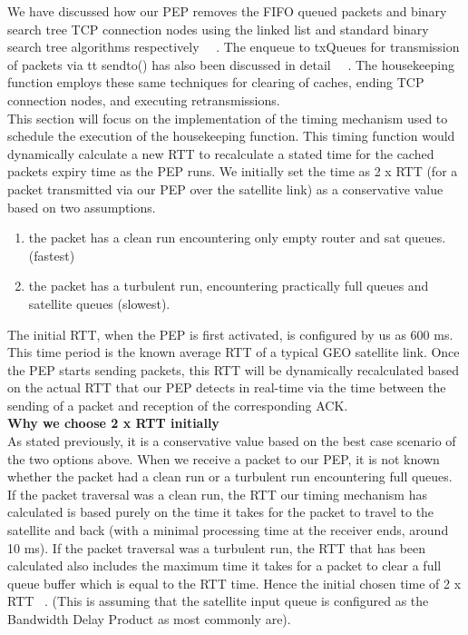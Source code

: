 We have discussed how our PEP removes the FIFO queued packets and binary search tree TCP connection nodes using the linked list and standard binary search tree algorithms respectively ~\cite{42}~\cite{43}. The enqueue to txQueues for transmission of packets via {tt sendto()} has also been discussed in detail ~\cite{35}~\cite{38}. The housekeeping function employs these same techniques for clearing of caches, ending TCP connection nodes, and executing retransmissions. \\

This section will focus on the implementation of the timing mechanism used to schedule the execution of the housekeeping function. This timing function would dynamically calculate a new RTT to recalculate a stated time for the cached packets expiry time as the PEP runs. We initially set the time as 2 x RTT (for a packet transmitted via our PEP over the satellite link) as a conservative value based on two assumptions. \\

\begin{enumerate}
\item the packet has a clean run encountering only empty router and sat queues. (fastest)
\item the packet has a turbulent run, encountering practically full queues and satellite queues (slowest). \\
\end{enumerate}

The initial RTT, when the PEP is first activated, is configured by us as 600 ms. This time period is the known average RTT of a typical GEO satellite link. Once the PEP starts sending packets, this RTT will be dynamically recalculated based on the actual RTT that our PEP detects in real-time via the time between the sending of a packet and reception of the corresponding ACK.\\

\noindent \textbf{Why we choose 2 x RTT initially} \\
As stated previously, it is a conservative value based on the best case scenario of the two options above. When we receive a packet to our PEP, it is not known whether the packet had a clean run or a turbulent run encountering full queues. \\

If the packet traversal was a clean run, the RTT our timing mechanism has calculated is based purely on the time it takes for the packet to travel to the satellite and back (with a minimal processing time at the receiver ends, around 10 ms). If the packet traversal was a turbulent run, the RTT that has been calculated also includes the maximum time it takes for a packet to clear a full queue buffer which is equal to the RTT time. Hence the initial chosen time of 2 x RTT ~\cite{4}. (This is assuming that the satellite input queue is configured as the Bandwidth Delay Product as most commonly are). \\ 

